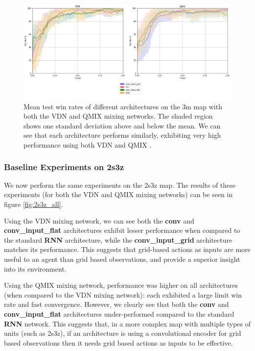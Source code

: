 \begin{figure}[h]
    \centering
    \hbox{\hspace{-6.35em}\includegraphics[width=1.34\textwidth]{images/graphs/all3m.png}}
    \caption{Mean test win rates of different architectures on the 3m map with both the VDN and QMIX mixing networks. The shaded region shows one standard deviation above and below the mean. We can see that each architecture performs similarly, exhibiting very high performance using both VDN and QMIX .}
    \label{fig:3m_all}
\end{figure}

\subsubsection{Baseline Experiments on 2s3z}
We now perform the same experiments on the 2s3z map. The results of these experiments (for both the VDN and QMIX mixing networks) can be seen in figure \ref{fig:2s3z_all}.

Using the VDN mixing network, we can see both the \textbf{conv} and \textbf{conv\_input\_flat} architectures exhibit lesser performance when compared to the standard \textbf{RNN} architecture, while the \textbf{conv\_input\_grid} architecture matches its performance. This suggests that grid-based actions as inputs are more useful to an agent than grid based observations, and provide a superior insight into its environment.


Using the QMIX mixing network, performance was higher on all architectures (when compared to the VDN mixing network): each exhibited a large limit win rate and fast convergence. However, we clearly see that both the \textbf{conv} and \textbf{conv\_input\_flat} architectures under-performed compared to the standard \textbf{RNN} network. This suggests that, in a more complex map with multiple types of units (such as 2s3z), if an architecture is using a convolutional encoder for grid based observations then it needs grid based actions as inputs to be effective. 

